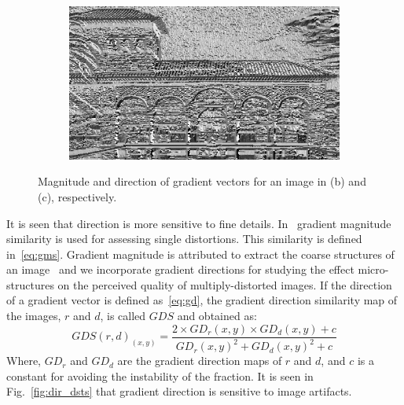 \begin{figure}
\begin{subfigure}[b]{0.3\textwidth}
         \centering
         \includegraphics[width= \textwidth]{./figs/dir_ref}
         \caption{}
         \label{fig:sample_dir_dir}
     \end{subfigure}
     \caption{Magnitude and direction of gradient vectors for an image in (b) and (c), respectively.}
        \label{fig:sample_dir}
\end{figure}
It is seen that direction is more sensitive to fine details. In~\cite{Xue2014} gradient magnitude similarity is used for assessing single distortions. This similarity is defined in~\ref{eq:gms}. Gradient magnitude is attributed to extract the coarse structures of an image~\cite{xue2014blind} and we incorporate gradient directions for studying the effect micro-structures on the perceived quality of multiply-distorted images. If the direction of a gradient vector is defined as~\ref{eq:gd}, the gradient direction similarity map of the images, $r$ and $d$, is called $GDS$ and obtained as:
\begin{equation}
    GDS(r, d)_{(x, y)}=\frac{2\times GD_r(x, y)\times GD_d(x, y)+c}{GD_r(x, y)^2+GD_d(x, y)^2 +c}
    \label{eq:gd_similarity}
\end{equation}
Where, $GD_r$ and $GD_d$ are the gradient direction maps of $r$ and $d$, and $c$ is a constant for avoiding the instability of the fraction. It is seen in Fig.~\ref{fig:dir_dsts} that gradient direction is sensitive to image artifacts.
